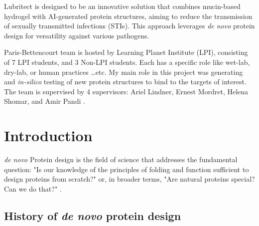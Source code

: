 \documentclass[11pt,a4paper]{article}
\begin{document}
Lubritect is designed to be an innovative solution that combines 
mucin-based hydrogel with AI-generated protein structures, aiming to 
reduce the transmission of sexually transmitted infections (STIs). This 
approach leverages \emph{de novo} protein design for versatility against 
various pathogens. 

Paris-Bettencourt team is hosted by Learning Planet Institute (LPI),
consisting of 7 LPI students, and 3 Non-LPI students.
Each has a specific role like wet-lab, dry-lab, or human practices \ldots etc. 
My main role in this project was generating and \emph{in-silico} testing of new protein structures to bind to the targets of interest.
The team is supervised by 4 supervisors: Ariel Lindner, Ernest Mordret, Helena 
Shomar, and Amir Pandi \cite{paris_bettencourt_team}.

\section{Introduction}

\emph{de novo} Protein design is the field of science that addresses the 
fundamental question: "Is our knowledge of the principles of folding 
and function sufficient to design proteins from scratch?" 
\cite{korendovych2020novo} or, in broader terms, "Are natural proteins 
special? Can we do that?" \cite{hecht2018natural}.

\subsection{History of \emph{de novo} protein design}
\end{document}
